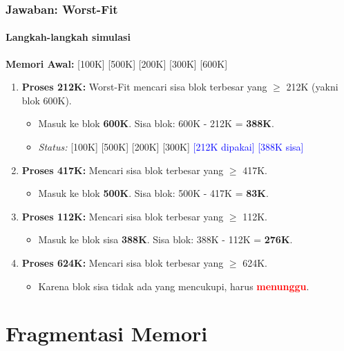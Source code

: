 \documentclass[t,aspectratio=169,xcolor=dvipsnames]{beamer}
\newcommand{\tem}[1]{\textbf{\textcolor{red}{#1}}}
\begin{document}
\begin{frame}
    \frametitle{Jawaban: Worst-Fit}
    \framesubtitle{Langkah-langkah simulasi}
    \small
    \textbf{Memori Awal:} [100K] [500K] [200K] [300K] [600K]
    
    \begin{enumerate}
        \item \textbf{Proses 212K:} Worst-Fit mencari sisa blok terbesar yang $\ge$ 212K (yakni blok 600K).
        \begin{itemize}
            \item Masuk ke blok \textbf{600K}. Sisa blok: 600K - 212K = \textbf{388K}.
            \item \textit{Status:} [100K] [500K] [200K] [300K] \textcolor{blue}{[212K dipakai] [388K sisa]}
        \end{itemize}
        \item \textbf{Proses 417K:} Mencari sisa blok terbesar yang $\ge$ 417K.
        \begin{itemize}
            \item Masuk ke blok \textbf{500K}. Sisa blok: 500K - 417K = \textbf{83K}.
        \end{itemize}
        \item \textbf{Proses 112K:} Mencari sisa blok terbesar yang $\ge$ 112K.
        \begin{itemize}
            \item Masuk ke blok sisa \textbf{388K}. Sisa blok: 388K - 112K = \textbf{276K}.
        \end{itemize}
        \item \textbf{Proses 624K:} Mencari sisa blok terbesar yang $\ge$ 624K.
        \begin{itemize}
            \item Karena blok sisa tidak ada yang mencukupi, harus \tem{menunggu}.
        \end{itemize}
    \end{enumerate}
\end{frame}

\section{Fragmentasi Memori}
\end{document}
